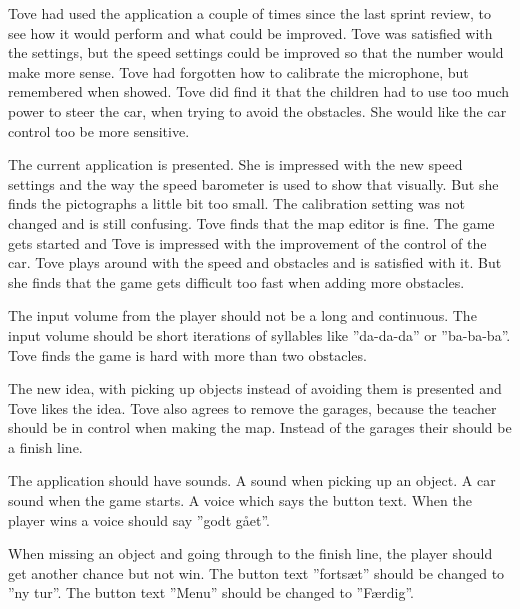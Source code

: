 Tove had used the application a couple of times since the last sprint review, to see how it would perform and what could be improved.
Tove was satisfied with the settings, but the speed settings could be improved so that the number would make more sense.
Tove had forgotten how to calibrate the microphone, but remembered when showed.
Tove did find it that the children had to use too much power to steer the car, when trying to avoid the obstacles.
She would like the car control too be more sensitive.


The current application is presented.
She is impressed with the new speed settings and the way the speed barometer is used to show that visually.
But she finds the pictographs a little bit too small.
The calibration setting was not changed and is still confusing.
Tove finds that the map editor is fine.
The game gets started and Tove is impressed with the improvement of the control of the car.
Tove plays around with the speed and obstacles and is satisfied with it.
But she finds that the game gets difficult too fast when adding more obstacles.


The input volume from the player should not be a long and continuous.
The input volume should be short iterations of syllables like ''da-da-da'' or ''ba-ba-ba''.
Tove finds the game is hard with more than two obstacles.


The new idea, with picking up objects instead of avoiding them is presented and Tove likes the idea.
Tove also agrees to remove the garages, because the teacher should be in control when making the map.
Instead of the garages their should be a finish line.


The application should have sounds.
A sound when picking up an object.
A car sound when the game starts.
A voice which says the button text.
When the player wins a voice should say ''godt gået''.

When missing an object and going through to the finish line, the player should get another chance but not win.
The button text ''fortsæt'' should be changed to ''ny tur''.
The button text ''Menu'' should be changed to ''Færdig''.